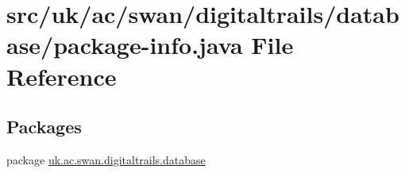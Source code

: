 \hypertarget{database_2package-info_8java}{\section{src/uk/ac/swan/digitaltrails/database/package-\/info.java File Reference}
\label{database_2package-info_8java}
}
\subsection*{Packages}
\begin{DoxyCompactItemize}
\item 
package \hyperlink{namespaceuk_1_1ac_1_1swan_1_1digitaltrails_1_1database}{uk.\+ac.\+swan.\+digitaltrails.\+database}
\end{DoxyCompactItemize}
